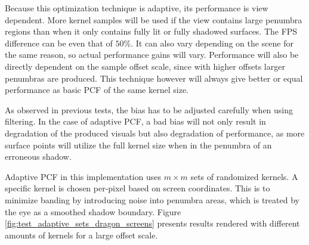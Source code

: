 Because this optimization technique is adaptive, its performance is view dependent. More kernel samples will be used if the view contains large penumbra regions than when it only contains fully lit or fully shadowed surfaces. The FPS difference can be even that of \(50\%\). It can also vary depending on the scene for the same reason, so actual performance gains will vary. Performance will also be directly dependent on the sample offset scale, since with higher offsets larger penumbras are produced. This technique however will always give better or equal performance as basic PCF of the same kernel size.

As observed in previous tests, the bias has to be adjusted carefully when using filtering. In the case of adaptive PCF, a bad bias will not only result in degradation of the produced visuals but also degradation of performance, as more surface points will utilize the full kernel size when in the penumbra of an erroneous shadow.

Adaptive PCF in this implementation uses \(m\times m\) sets of randomized kernels. A specific kernel is chosen per-pixel based on screen coordinates. This is to minimize banding by introducing noise into penumbra areas, which is treated by the eye as a smoothed shadow boundary. Figure \ref{fig:test_adaptive_sets_dragon_screens} presents results rendered with different amounts of kernels for a large offset scale.

